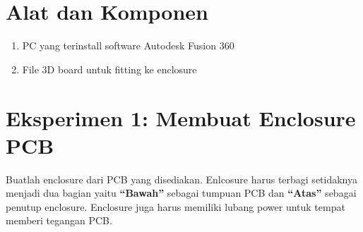 \section{Alat dan Komponen}
\begin{enumerate}
    \item PC yang terinstall software Autodesk Fusion 360
    \item File 3D board untuk fitting ke enclosure
\end{enumerate}



\section{Eksperimen 1: Membuat Enclosure PCB}
Buatlah enclosure dari PCB yang disediakan. Enlcosure harus terbagi setidaknya menjadi dua bagian yaitu
\textbf{“Bawah”} sebagai tumpuan PCB dan \textbf{“Atas”} sebagai penutup enclosure. Enclosure juga harus memiliki
lubang power untuk tempat memberi tegangan PCB.

